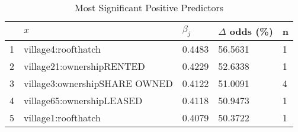 \begin{table}[ht]
\centering
\begin{tabular}{rllll}
  \hline
 & $x$ & $\beta_j$ & $\Delta$ odds (\%) & n \\ 
  \hline
1 & village4:roofthatch & 0.4483 & 56.5631 & 1 \\ 
  2 & village21:ownershipRENTED & 0.4229 & 52.6338 & 1 \\ 
  3 & village3:ownershipSHARE OWNED & 0.4122 & 51.0091 & 4 \\ 
  4 & village65:ownershipLEASED & 0.4118 & 50.9473 & 1 \\ 
  5 & village1:roofthatch & 0.4079 & 50.3722 & 1 \\ 
   \hline
\end{tabular}
\caption{Most Significant Positive Predictors} 
\label{tab:pos}
\end{table}
